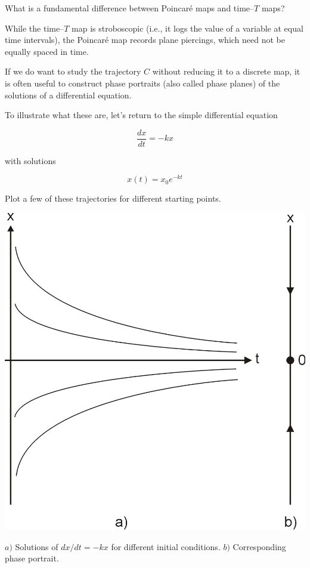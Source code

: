 \begin{cue}
What is a fundamental difference between Poincar\'{e} maps and time--$T$ maps?   
\end{cue}

While the time--$T$ map is stroboscopic (i.e., it logs the value of a variable at equal time intervals), the Poincar\'{e} map records plane piercings, which need not be equally spaced in time.

\pagebreak


If we do want to study the trajectory $C$ without reducing it to a discrete map, it is often useful to construct phase portraits (also called phase planes) of the solutions of a differential equation. 

To illustrate what these are, let's return to the simple differential equation

\begin{equation}
\frac{dx}{dt} = -k x
\end{equation} 

with solutions

\begin{equation}
x(t) = x_0 e^{-kt}
\end{equation} 

\begin{cue}
Plot a few of these trajectories for different starting points.  
\end{cue}

\begin{marginfigure}
\centering
\includegraphics{dynamic/figures/phaseportrait}
\caption{$a)$ Solutions of ${dx}/{dt} = -k x$ for different initial conditions. $b)$ Corresponding phase portrait.}
\label{fig-phaseportrait}
\end{marginfigure} 

